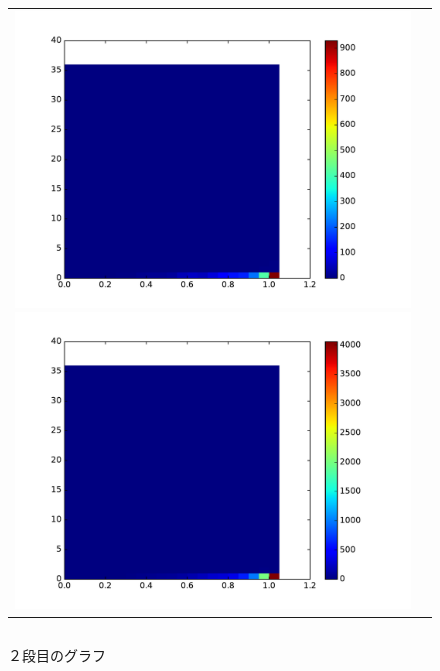 \documentclass[a4paper,10pt,onecolumn,oneside,openany]{jsbook}
\begin{document}
\begin{figure}[h]
 \begin{tabular}{cc}
 	\begin{minipage}[t]{0.45\hsize}
	 \centering
	 \includegraphics[keepaspectratio, scale = 0.35]{colormap_block_1.pdf}
	 \caption{１段目のグラフ}
	 \label{first_block}
	\end{minipage}
        \begin{minipage}[t]{0.45\hsize}
	 \centering
	 \includegraphics[keepaspectratio, scale = 0.35]{colormap_block_2.pdf}
	 \caption{２段目のグラフ}
	 \label{second_block}
	\end{minipage}
 \end{tabular}
  \begin{tabular}{cc}

\end{tabular}
\end{figure}
\end{document}
